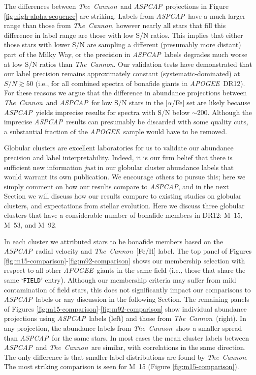 \documentclass[12pt,preprint]{aastex}
\newcommand{\project}[1]{\textsl{#1}}
\newcommand{\TheCannon}{\project{The~Cannon}}
\newcommand{\acronym}[1]{{\small{#1}}}
\newcommand{\apogee}{\project{\acronym{APOGEE}}}
\newcommand{\aspcap}{\project{\acronym{ASPCAP}}}
\newcommand{\dr}{\acronym{DR12}}
\begin{document}
The differences between \TheCannon\ and \aspcap\ projections in Figure \ref{fig:high-alpha-sequence} are striking.  Labels
from \aspcap\ have a much larger range than those from \TheCannon,
however nearly all stars that fill this difference in label range are those
with low S/N ratios.  This implies that either those stars with lower S/N
are sampling a different (presumably more distant) part of the Milky Way,
or the precision in \aspcap\ labels degrades much worse at low S/N ratios than \TheCannon.
Our validation tests have demonstrated that our label precision remains
approximately constant (systematic-dominated) at $S/N \gtrsim 50$ (i.e.,
for all combined spectra of bonafide giants in \apogee\ \dr).  For these reasons we argue
that the difference in abundance projections between \TheCannon\ and
\aspcap\ for low S/N stars in the [$\alpha$/Fe] set are likely because \aspcap\
yields imprecise results for spectra with S/N below $\sim$200.  Although
the imprecise \aspcap\ results can presumably be discarded with some 
quality cuts, a substantial fraction of the \apogee\ sample would have
to be removed.


Globular clusters are excellent laboratories for us to validate
our abundance precision and label interpretability.  Indeed, it is our
firm belief that there is sufficient new information \emph{just} in our
globular cluster abundance labels that would warrant its own publication.
We encourage others to pursue this; here we simply comment on how our results 
compare to \aspcap, and in the next Section we will discuss how our
results compare to existing studies on globular clusters, and 
expectations from stellar evolution.  Here we discuss three globular
clusters that have a considerable number of bonafide members in \dr:
M~15, M~53, and M~92.  


In each cluster we attributed stars to be bonafide members based on the
\aspcap\ radial velocity and \TheCannon\ [Fe/H] label.  The top panel of
Figures \ref{fig:m15-comparison}-\ref{fig:m92-comparison} shows our 
membership selection with respect to all other \apogee\ giants in the
same field (i.e., those that share the same `\texttt{FIELD}' entry).
Although our membership criteria may suffer from mild contamination of
field stars, this does not significantly impact our comparisons to 
\aspcap\ labels or any discussion in the following Section.  The 
remaining panels of Figures \ref{fig:m15-comparison}-\ref{fig:m92-comparison} show individual abundance projections
using \aspcap\ labels (left) and those from \TheCannon\ (right). 
In any projection, the abundance labels from \TheCannon\ show a smaller
spread than \aspcap\ for the same stars.  In most cases the mean cluster
labels between \aspcap\ and \TheCannon\ are similar, with correlations
in the same direction. The only difference is that smaller label
distributions are found by \TheCannon.  The most striking comparison 
is seen for M~15 (Figure \ref{fig:m15-comparison}).
\end{document}
